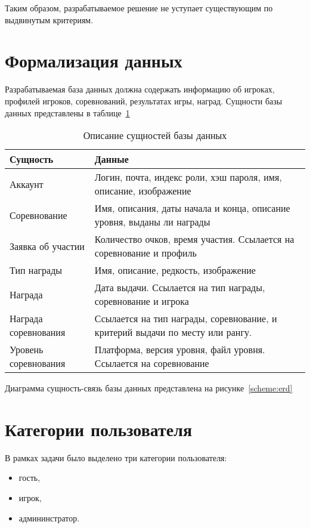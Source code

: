 Таким образом, разрабатываемое решение не уступает существующим по выдвинутым критериям.

\section{Формализация данных}
Разрабатываемая база данных должна содержать информацию об игроках, профилей игроков, соревнований, результатах игры, наград. Сущности базы данных представлены в таблице~\ref{tbl:dataop}

\begin{table}[h!]
	\centering
	\caption{\label{tbl:dataop}Описание сущностей базы данных}
	\begin{tabular}{|l|p{8cm}|}
		\hline
		Сущность & Данные \\\hline
		Аккаунт & Логин, почта, индекс роли, хэш пароля, имя, описание, изображение \\\hline
		Соревнование & Имя, описания, даты начала и конца, описание уровня, выданы ли награды \\\hline
		Заявка об участии & Количество очков, время участия. Ссылается на соревнование и профиль \\\hline
		Тип награды & Имя, описание, редкость, изображение\\\hline
		Награда & Дата выдачи. Ссылается на тип награды, соревнование и игрока \\\hline
		Награда соревнования & Ссылается на тип награды, соревнование, и критерий выдачи по месту или рангу.\\\hline
		Уровень соревнования & Платформа, версия уровня, файл уровня. Ссылается на соревнование\\\hline
	\end{tabular}
\end{table}
\FloatBarrier
Диаграмма сущность-связь базы данных представлена на рисунке~\ref{scheme:erd}

\FloatBarrier
\section{Категории пользователя}

В рамках задачи было выделено три категории пользователя:
\begin{itemize}
	\item гость,
	\item игрок,
	\item админинстратор.
\end{itemize}

